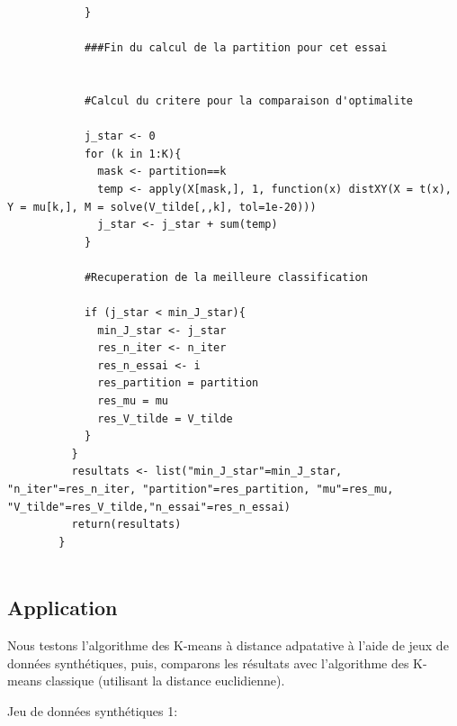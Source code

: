 \documentclass[a4paper,11pt,oneside,roman]{article}
\begin{document}
\begin{lstlisting}
            }
            
            ###Fin du calcul de la partition pour cet essai
            
            
            #Calcul du critere pour la comparaison d'optimalite
            
            j_star <- 0
            for (k in 1:K){
              mask <- partition==k
              temp <- apply(X[mask,], 1, function(x) distXY(X = t(x), Y = mu[k,], M = solve(V_tilde[,,k], tol=1e-20)))
              j_star <- j_star + sum(temp)
            }
            
            #Recuperation de la meilleure classification
            
            if (j_star < min_J_star){
              min_J_star <- j_star
              res_n_iter <- n_iter
              res_n_essai <- i
              res_partition = partition
              res_mu = mu
              res_V_tilde = V_tilde
            }
          }
          resultats <- list("min_J_star"=min_J_star, "n_iter"=res_n_iter, "partition"=res_partition, "mu"=res_mu, "V_tilde"=res_V_tilde,"n_essai"=res_n_essai)
          return(resultats)
        }
        
    \end{lstlisting}

    \subsection{Application}
    Nous testons l'algorithme des K-means à distance adpatative à l'aide de jeux de données synthétiques, puis, comparons les résultats avec l'algorithme des K-means classique (utilisant la distance euclidienne).

    Jeu de données synthétiques 1:
\end{document}
